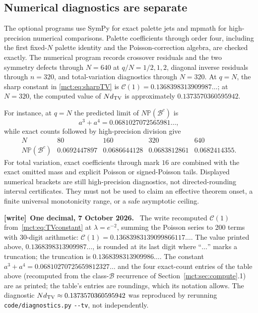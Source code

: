 \documentclass[11pt]{article}
\theoremstyle{definition}
\newcommand{\Prob}{\mathbb P}
\newcommand{\classB}{\mathcal B}
\newcommand{\file}[1]{\nolinkurl{#1}}
\newenvironment{writenote}[1][]{\par\smallskip\begingroup\small
 \noindent\textbf{[write]}\if\relax\detokenize{#1}\relax\else~\textbf{#1.}\fi\ }%
 {\par\endgroup\smallskip}
\begin{document}
\subsection{Numerical diagnostics are separate}
The optional programs use SymPy for exact palette jets and mpmath for high-precision numerical comparisons. Palette coefficients through order four, including the first fixed-$N$ palette identity and the Poisson-correction algebra, are checked exactly. The numerical program records crossover residuals and the two symmetry defects through $N=640$ at $q/N=1/2,1,2$, diagonal inverse residuals through $n=320$, and total-variation diagnostics through $N=320$. At $q=N$, the sharp constant in \eqref{mct:eq:sharpTV} is $\mathcal C(1)=0.1368398313909987\ldots$; at $N=320$, the computed value of $N d_{\rm TV}$ is approximately $0.1373570360595942$.

For instance, at $q=N$ the predicted limit of $N\Prob(\classB^c)$ is
\[
 a^3+a^4=0.0681027072565981\ldots,
\]
while exact counts followed by high-precision division give
\[
\begin{array}{c|rrrr}
N&80&160&320&640\\ \hline
N\Prob(\classB^c)&0.0692447897&0.0686644128&0.0683812861&0.0682414355 .
\end{array}
\]
For total variation, exact coefficients through mark $16$ are combined with the exact omitted mass and explicit Poisson or signed-Poisson tails. Displayed numerical brackets are still high-precision diagnostics, not directed-rounding interval certificates. They must not be used to claim an effective theorem onset, a finite universal monotonicity range, or a safe asymptotic ceiling.
\begin{writenote}[One decimal, 7 October 2026]
The write recomputed $\mathcal C(1)$ from~\eqref{mct:eq:TVconstant} at $\lambda=e^{-2}$, summing the Poisson series to 200 terms with 30-digit arithmetic: $\mathcal C(1)=0.13683983139099866117\ldots$. The value printed above, $0.1368398313909987\ldots$, is rounded at its last digit where ``$\ldots$'' marks a truncation; the truncation is $0.1368398313909986\ldots$. The constant $a^3+a^4=0.06810270725659812327\ldots$ and the four exact-count entries of the table above (recomputed from the class-$\classB$ recurrence of Section~\ref{mct:sec:compute}.1) are as printed; the table's entries are roundings, which its notation allows. The diagnostic $Nd_{\rm TV}\approx0.1373570360595942$ was reproduced by rerunning \file{code/diagnostics.py} \texttt{-{}-tv}, not independently.
\end{writenote}
\end{document}
